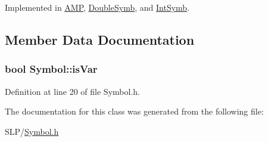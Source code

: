 Implemented in \hyperlink{class_a_m_p_aa22f858fe19e8d00dea47ee9a6c26040}{A\+M\+P}, \hyperlink{class_double_symb_a0c08d8436a47c3d9e96d19aa80a2bab9}{Double\+Symb}, and \hyperlink{class_int_symb_ad4dd7298bf4a8ea002e86671a96f77d9}{Int\+Symb}.



\subsection{Member Data Documentation}
\hypertarget{class_symbol_a4083674d0a03f08336b5767f3e83ddde}{
\subsubsection[{is\+Var}]{\setlength{\rightskip}{0pt plus 5cm}bool Symbol\+::is\+Var\hspace{0.3cm}{\ttfamily [protected]}}}\label{class_symbol_a4083674d0a03f08336b5767f3e83ddde}


Definition at line 20 of file Symbol.\+h.



The documentation for this class was generated from the following file\+:\begin{DoxyCompactItemize}
\item 
S\+L\+P/\hyperlink{_symbol_8h}{Symbol.\+h}\end{DoxyCompactItemize}
